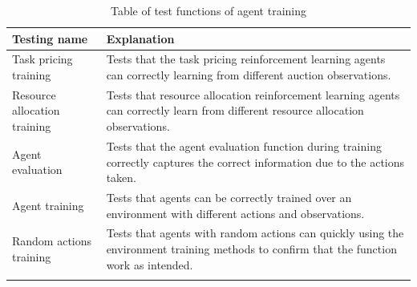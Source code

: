 \begin{longtable}{|p{3cm}|p{11cm}|} \hline
    \textbf{Testing name} & \textbf{Explanation} \\ \hline
    Task pricing training & Tests that the task pricing reinforcement learning agents can correctly learning from
        different auction observations. \\ \hline
    Resource allocation training & Tests that resource allocation reinforcement learning agents can correctly
        learn from different resource allocation observations. \\ \hline
    Agent evaluation & Tests that the agent evaluation function during training correctly captures the correct
        information due to the actions taken. \\ \hline
    Agent training & Tests that agents can be correctly trained over an environment with different actions and
        observations. \\ \hline
    Random actions training & Tests that agents with random actions can quickly using the environment training
        methods to confirm that the function work as intended. \\ \hline
    \caption{Table of test functions of agent training}
    \label{tab:training_testing}
\end{longtable}

